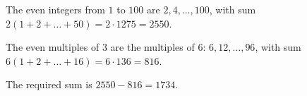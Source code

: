 The even integers from $1$ to $100$ are $2,4,\dots,100$, with sum $2(1+2+\dots+50)=2\cdot1275=2550$.

The even multiples of $3$ are the multiples of $6$: $6,12,\dots,96$, with sum $6(1+2+\dots+16)=6\cdot136=816$.

The required sum is $2550-816=\boxed{1734}$.
